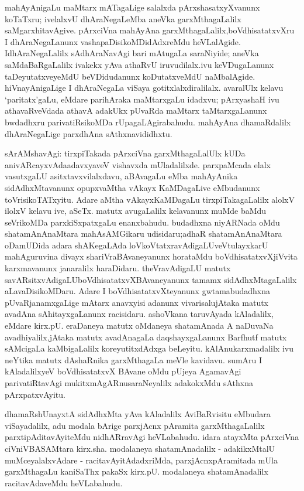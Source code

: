 mahAyAnigaLu maMtarx mATagaLige salalxda pArxshasatxyXvanunx koTaTxru; ivelalxvU dhAraNegaLeMba aneVka garxMthagaLalilx saMgarxhitavAgive. pArxciVna mahAyAna garxMthagaLalilx,\break boVdhisatatxvXru I dhAraNegaLanunx vashapaDisikoMDidAdxreMdu heVLalAgide. I\break dhAraNegaLalilx sAdhAraNavAgi bari mAtugaLa saraNiyide; aneVka saMdaBaRgaLalilx ivakekx yAva athaRvU iruvudilalx.ivu keVDugaLanunx taDeyutatxveyeMdU beVDidudanunx koDutatxveMdU naMbalAgide. hiVnayAnigaLige I dhAraNegaLa viSaya gotitxlalx\-diralilalx. avaralUlx kelavu `paritatx'gaLu, eMdare parihAraka maMtarxgaLu idadxvu; pArxyashaH ivu athavaRveVdada athavA adakUkx pUvaRda maMtarx taMtarxgaLanunx bwdadhxru parivatiRsikoMDa rUpagaLAgirabahudu. mahAyAna dhamaRdalilx dhAraNegaLige parxdhAna sAthxnavididhxtu.

\newpage

sArAMshavAgi: tirxpiTakada pArxciVna garxMthagaLalUlx kUDa anivARcayxvAda\break adavxyaveV vishavxda mUladalilxde. parxpaMcada elalx vasutxgaLU asitxtavxvilalxdavu, aBAva\-gaLu eMba mahAyAnika sidAdhxMtavanunx opupxvaMtha vAkayx KaMDagaLive eMbudanunx toVrisikoTATxyitu. Adare aMtha vAkayxKaMDagaLu tirxpiTakagaLalilx alolxV ilolxV kelavu ive, aSeTx. matutx avugaLalilx kelavanunx muMde baMdu seVrikoMDa parxkiSxpatxgaLu enanx\-bahudu. budadhxna niyARNada oMdu shatamAnAnaMtara mahAsAMGikaru udi\-sidaru;\break adhaR shatamAnAnaMtara oDamUDida adara shAKegaLAda loVkoVtatxravAdigaLU\break veVtulayxkarU mahAguruvina divayx shariVraBAvaneyanunx horataMdu boVdhisatatxvX\break jiVvita karxmavanunx janaralilx haraDidaru. theVravAdigaLU matutx savARsitxvAdigaLU\break boVdhisatatxvXBAvaneyanunx tamamx sidAdhxMtagaLalilx aLavaDisikoMDaru. Adare I boVdhi\-satatxvXteyanunx gwtamabudadhxna pUvaRjanamxgaLige mAtarx anavxyisi adanunx vivarisalu\break jAtaka matutx avadAna sAhitayxgaLanunx racisidaru. ashoVkana taruvAyada kAladalilx, eMdare kirx.pU. eraDaneya matutx oMdaneya shatamAnada A naDuvaNa avadhiyalilx,\break jAtaka matutx avadAnagaLa daqshayxgaLanunx Barfhutf matutx sAMcigaLa kaMbigaLalilx kore\-yutitxdAdxga beLeyitu. kAlAnukarxmadalilx ivu neYtika matutx dAshaRnika garxMthagaLa meVle kavidavu. sumAru I kAladalilxyeV boVdhisatatxvX BAvane oMdu pUjeya Agama\-vAgi parivatiRtavAgi mukitxmAgARnusaraNeyalilx adakokxMdu sAthxna pArxpatxvAyitu.

dhamaRshUnayxtA sidAdhxMta yAva kAladalilx AviBaRvisitu eMbudara viSayadalilx, adu modala bArige parxjAcnx pAramita garxMthagaLalilx parxtipAditavAyiteMdu nidhARravAgi heVLabahudu. idara atayxMta pArxciVna ciVniVBASAMtara kirx.sha. modalaneya shatamAnadalilx - adakikxMtalU muMceyalalxvAdare - racitavAyitAdadxriMda, parxjAcnxpAramitada mUla garxMthagaLu kaniSaThx pakaSx kirx.pU. modalaneya shatamAnadalilx racitavAdaveMdu heVLabahudu.

